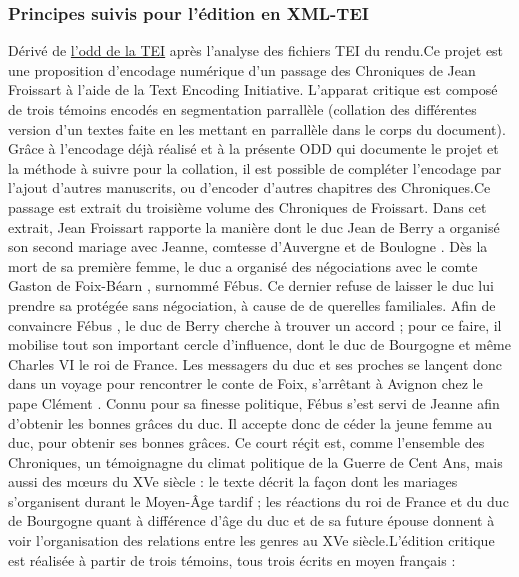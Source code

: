 \documentclass[12pt, a4paper]{article}
\begin{document}
                \subsubsection{Principes suivis pour l'édition en XML-TEI}
                Dérivé de  \href{https://www.tei-c.org/Vault/P5/current/xml/tei/odd/p5subset.xml}{l'odd de la TEI}  après l'analyse des fichiers TEI du rendu.Ce projet est une proposition d'encodage numérique d'un passage des Chroniques de Jean Froissart à l'aide de la 
                  Text Encoding Initiative. L'apparat critique est composé de trois témoins
                  encodés en segmentation parrallèle (collation des différentes version d'un textes faite en les mettant en parrallèle dans le corps du document).
                  Grâce à l'encodage déjà réalisé et à la présente ODD qui documente le projet et la méthode à suivre pour la collation, il est possible de compléter l'encodage
                  par l'ajout d'autres manuscrits, ou d'encoder d'autres chapitres des Chroniques.Ce passage est extrait du troisième volume des Chroniques de Froissart. Dans cet extrait,  Jean Froissart  rapporte la manière
                     dont le  duc Jean de Berry  a organisé son second mariage avec  Jeanne, comtesse d’Auvergne et de Boulogne .
                     Dès la mort de sa première femme, le duc a organisé des négociations avec le comte  Gaston de Foix-Béarn , surnommé Fébus. Ce dernier refuse de laisser
                     le duc lui prendre sa protégée sans négociation, à cause de de querelles familiales. Afin de convaincre  Fébus , le  duc de Berry  cherche à trouver
                     un accord ; pour ce faire, il mobilise tout son important cercle d'influence, dont le  duc de Bourgogne  et même  Charles VI  le roi de France. Les messagers du duc et ses proches se lançent donc dans un voyage pour rencontrer le conte de Foix, s'arrêtant à Avignon chez le  pape Clément . Connu pour
                     sa finesse politique,  Fébus  s'est servi de  Jeanne 
                     afin d'obtenir les bonnes grâces du duc. Il accepte donc de céder la jeune femme au duc, pour obtenir ses bonnes grâces. Ce court réçit est, comme l'ensemble des Chroniques, un témoignagne du climat politique de la Guerre de Cent Ans, mais aussi des mœurs du XVe siècle : le texte décrit 
                     la façon dont les mariages s'organisent durant le Moyen-Âge tardif ; les réactions du roi de France et du  duc de Bourgogne  quant à différence d'âge du duc et de sa future
                     épouse donnent à voir l'organisation des relations entre les genres au XVe siècle.L'édition critique est réalisée à partir de trois témoins, tous trois écrits en moyen français :
                     
\end{document}
